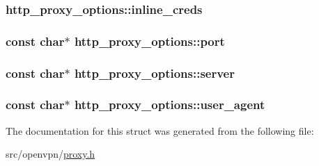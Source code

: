 \subsubsection[{inline\+\_\+creds}]{ http\+\_\+proxy\+\_\+options\+::inline\+\_\+creds}\label{structhttp__proxy__options_a9f69ad3374ce517f81591ba8a2094921}
\hypertarget{structhttp__proxy__options_a5eec9078cb40b9e5839f7322a9f25b8b}{}
\subsubsection[{port}]{\setlength{\rightskip}{0pt plus 5cm}const char$\ast$ http\+\_\+proxy\+\_\+options\+::port}\label{structhttp__proxy__options_a5eec9078cb40b9e5839f7322a9f25b8b}
\hypertarget{structhttp__proxy__options_afa4d014cd5174ce3cc82947c54be8a54}{}
\subsubsection[{server}]{\setlength{\rightskip}{0pt plus 5cm}const char$\ast$ http\+\_\+proxy\+\_\+options\+::server}\label{structhttp__proxy__options_afa4d014cd5174ce3cc82947c54be8a54}
\hypertarget{structhttp__proxy__options_aa6f43a5c86de2e47e6d3512b765e1ea7}{}
\subsubsection[{user\+\_\+agent}]{\setlength{\rightskip}{0pt plus 5cm}const char$\ast$ http\+\_\+proxy\+\_\+options\+::user\+\_\+agent}\label{structhttp__proxy__options_aa6f43a5c86de2e47e6d3512b765e1ea7}


The documentation for this struct was generated from the following file\+:\begin{DoxyCompactItemize}
\item 
src/openvpn/\hyperlink{proxy_8h}{proxy.\+h}\end{DoxyCompactItemize}
